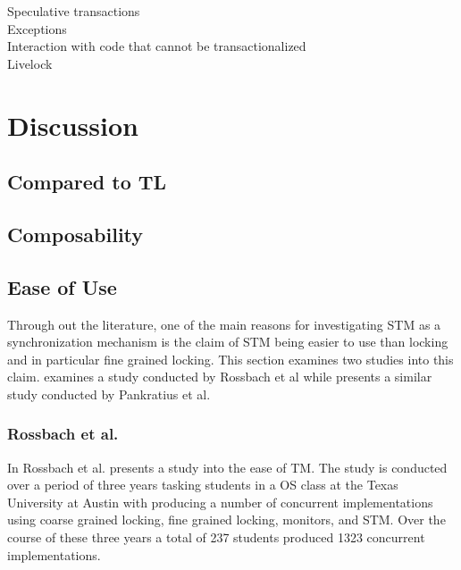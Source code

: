 
Speculative transactions\\
Exceptions\\
Interaction with code that cannot be transactionalized\\
Livelock\\





\section{Discussion}
\label{sec:stm_discussion}

\subsection{Compared to TL}

\subsection{Composability}
\subsection{Ease of Use}
Through out the literature, one of the main reasons for investigating \ac{STM} as a synchronization mechanism is the claim of \ac{STM} being easier to use than locking and in particular fine grained locking. This section examines two studies into this claim.  examines a study conducted by Rossbach et al while  presents a similar study conducted by Pankratius et al.
\subsubsection{Rossbach et al.}
\label{sec:stm_ease_rossbach}
In \cite{rossbach2010transactional} Rossbach et al. presents a study into the ease of \ac{TM}. The study is conducted over a period of three years tasking students in a \ac{OS} class at the Texas University at Austin with producing a number of concurrent implementations using coarse grained locking, fine grained locking, monitors, and \ac{STM}. Over the course of these three years a total of 237 students produced 1323 concurrent implementations. 

